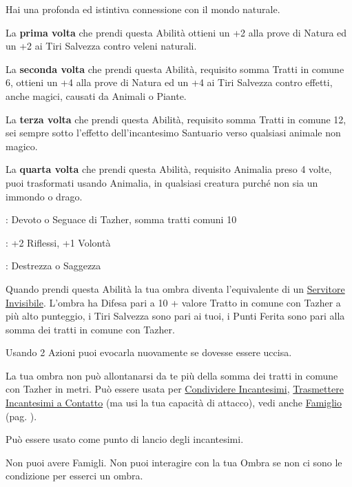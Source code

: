\begin{multicols}{2}
Hai una profonda ed istintiva connessione con il mondo naturale.

La \textbf{prima volta} che prendi questa Abilità ottieni un +2 alla prove di Natura ed un +2 ai Tiri Salvezza contro veleni naturali.

La \textbf{seconda volta} che prendi questa Abilità, requisito somma Tratti in comune 6, ottieni un +4 alla prove di Natura ed un +4 ai Tiri Salvezza contro effetti, anche magici, causati da Animali o Piante.

La \textbf{terza volta} che prendi questa Abilità, requisito somma Tratti in comune 12, sei sempre sotto l'effetto dell'incantesimo Santuario verso qualsiasi animale non magico.

La \textbf{quarta volta} che prendi questa Abilità, requisito Animalia preso 4 volte, puoi trasformati usando Animalia, in qualsiasi creatura purché non sia un immondo o drago.

\begin{description}[noitemsep, topsep=0pt, parsep=0pt, partopsep=0pt, leftmargin=0cm, labelwidth=2.5cm]
    \item[\textbf{Requisito}]: Devoto o Seguace di Tazher, somma tratti comuni 10
    \item[\textbf{Tiri Salvezza}]: +2 Riflessi, +1 Volontà
    \item[\textbf{Caratteristica}]: Destrezza o Saggezza
\end{description}

Quando prendi questa Abilità la tua ombra diventa l'equivalente di un \hyperlink{Servitore Invisibile}{Servitore Invisibile}.
L'ombra ha Difesa pari a 10 + valore Tratto in comune con Tazher a più alto punteggio, i Tiri Salvezza sono pari ai tuoi, i Punti Ferita sono pari alla somma dei tratti in comune con Tazher.

Usando 2 Azioni puoi evocarla nuovamente se dovesse essere uccisa.

La tua ombra non può allontanarsi da te più della somma dei tratti in comune con Tazher in metri. Può essere usata per \hyperlink{Condividere Incantesimi}{Condividere Incantesimi}, \hyperlink{Trasmettere Incantesimi a Contatto}{Trasmettere Incantesimi a Contatto} (ma usi la tua capacità di attacco), vedi anche \hyperlink{famiglio}{Famiglio} (pag. \pageref{famiglio}).

Può essere usato come punto di lancio degli incantesimi.

Non puoi avere Famigli. Non puoi interagire con la tua Ombra se non ci sono le condizione per esserci un ombra.


\end{multicols}

